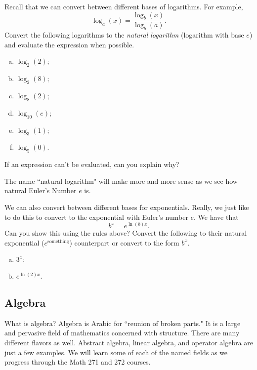     \begin{problem*}
    Recall that we can convert between different bases of logarithms. For example,
    \[
    \log_a(x)=\frac{\log_b(x)}{\log_b(a)}.
    \]
    Convert the following logarithms to the \emph{natural logarithm} (logarithm with base $e$) and evaluate the expression when possible.
    \begin{enumerate}[(a)]
        \item $\log_2(2)$;
        \item $\log_2(8)$;
        \item $\log_8(2)$;
        \item $\log_{10}(e)$;
        \item $\log_3(1)$;
        \item $\log_5(0)$.
    \end{enumerate}
    If an expression can't be evaluated, can you explain why?
    \end{problem*}

    \begin{remark}
    The name ``natural logarithm" will make more and more sense as we see how natural Euler's Number $e$ is.
    \end{remark}

    \begin{problem*}
    We can also convert between different bases for exponentials. Really, we just like to do this to convert to the exponential with Euler's number $e$. We have that
    \[
    b^x=e^{\ln(b)x}.
    \]
    Can you show this using the rules above? Convert the following to their natural exponential ($e^\textrm{something}$) counterpart or convert to the form $b^x$.
    \begin{enumerate}[(a)]
        \item $3^x$;
        \item $e^{\ln(2)x}$.
    \end{enumerate}
    \end{problem*}

    \subsection{Algebra}

    What is algebra? Algebra is Arabic for ``reunion of broken parts." It is a large and pervasive field of mathematics concerned with structure.  There are many different flavors as well.  Abstract algebra, linear algebra, and operator algebra are just a few examples. We will learn some of each of the named fields as we progress through the Math 271 and 272 courses.

